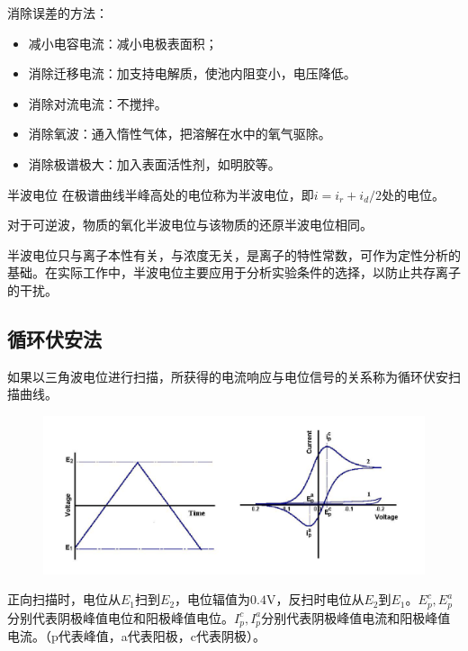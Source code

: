 \begin{note}
	消除误差的方法：
	\begin{itemize}
		\item 减小电容电流：减小电极表面积；
		\item 消除迁移电流：加支持电解质，使池内阻变小，电压降低。
		\item 消除对流电流：不搅拌。
		\item 消除氧波：通入惰性气体，把溶解在水中的氧气驱除。
		\item 消除极谱极大：加入表面活性剂，如明胶等。
	\end{itemize}
\end{note}

\begin{definition*}{半波电位}{}
	在极谱曲线半峰高处的电位称为半波电位，即$i=i_r+i_d/2$处的电位。
	
	对于可逆波，物质的氧化半波电位与该物质的还原半波电位相同。	
\end{definition*}

半波电位只与离子本性有关，与浓度无关，是离子的特性常数，可作为定性分析的基础。在实际工作中，半波电位主要应用于分析实验条件的选择，以防止共存离子的干扰。

\subsection{循环伏安法}
如果以三角波电位进行扫描，所获得的电流响应与电位信号的关系称为循环伏安扫描曲线。
\begin{figure}[!h]
	\centering
	\includegraphics[width=0.9\linewidth]{image/chp7_circular_VA}
	\label{fig:chp7circularva}
\end{figure}

正向扫描时，电位从$E_1$扫到$E_2$，电位辐值为$0.4\mathrm{V}$，反扫时电位从$E_2$到$E_1$。$E_p^c,E_p^a$分别代表阴极峰值电位和阳极峰值电位。$I_p^c,I_p^a$分别代表阴极峰值电流和阳极峰值电流。（p代表峰值，a代表阳极，c代表阴极）。

